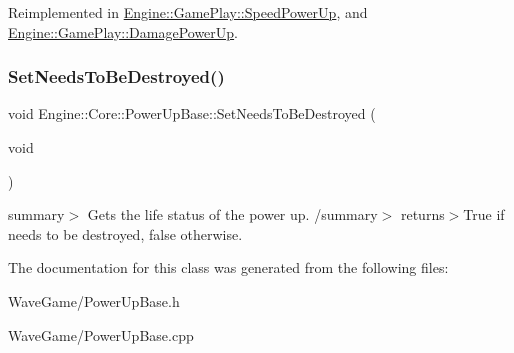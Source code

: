 Reimplemented in \hyperlink{class_engine_1_1_game_play_1_1_speed_power_up_ad305e70493c2b51a87e58d58cea73521}{Engine\+::\+Game\+Play\+::\+Speed\+Power\+Up}, and \hyperlink{class_engine_1_1_game_play_1_1_damage_power_up_a97bdd448602470ff4305b39eee866fd2}{Engine\+::\+Game\+Play\+::\+Damage\+Power\+Up}.

\mbox{\label{class_engine_1_1_core_1_1_power_up_base_a8f6f5112493d25a67ec0c05e65691728}} 
\subsubsection{\texorpdfstring{Set\+Needs\+To\+Be\+Destroyed()}{SetNeedsToBeDestroyed()}}
{\footnotesize\ttfamily void Engine\+::\+Core\+::\+Power\+Up\+Base\+::\+Set\+Needs\+To\+Be\+Destroyed (\begin{DoxyParamCaption}\item[{void}]{ }\end{DoxyParamCaption})}

summary$>$ Gets the life status of the power up. /summary$>$ returns$>$True if needs to be destroyed, false otherwise.

The documentation for this class was generated from the following files\+:\begin{DoxyCompactItemize}
\item 
Wave\+Game/Power\+Up\+Base.\+h\item 
Wave\+Game/Power\+Up\+Base.\+cpp\end{DoxyCompactItemize}
